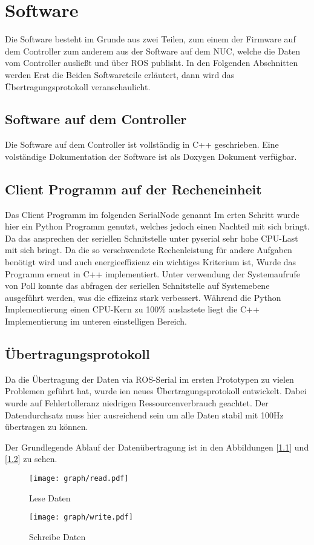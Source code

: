 \chapter{Software}

Die Software besteht im Grunde aus zwei Teilen, zum einem der Firmware auf dem \textmu Controller zum anderem aus der Software auf dem NUC, welche die Daten vom \textmu Controller ausließt und über ROS publisht.
In den Folgenden Abschnitten werden Erst die Beiden Softwareteile erläutert, dann wird das Übertragungsprotokoll veranschaulicht.


\section{Software auf dem \textmu Controller}
Die Software auf dem \textmu Controller ist vollständig in C++ geschrieben. Eine volständige Dokumentation der Software ist als Doxygen Dokument verfügbar.


\section{Client Programm auf der Recheneinheit}
Das Client Programm im folgenden SerialNode genannt 
Im erten Schritt wurde hier ein Python Programm genutzt, welches jedoch einen Nachteil mit sich bringt. Da das ansprechen der seriellen Schnitstelle unter pyserial sehr hohe CPU-Last mit sich bringt.
Da die so verschwendete Rechenleistung für andere Aufgaben benötigt wird und auch energieeffizienz ein wichtiges Kriterium ist, Wurde das Programm erneut in C++ implementiert. Unter verwendung der Systemaufrufe von 
Poll konnte das abfragen der seriellen Schnitstelle auf Systemebene ausgeführt werden, was die effizeinz stark verbessert. Während die Python Implementierung einen CPU-Kern zu 100\%
auslastete liegt die C++ Implementierung im unteren einstelligen Bereich.


\section{Übertragungsprotokoll}
Da die Übertragung der Daten via ROS-Serial im ersten Prototypen zu vielen Problemen geführt hat, wurde ien neues Übertragungsprotokoll entwickelt.
Dabei wurde auf Fehlertolleranz niedrigen Ressourcenverbrauch geachtet. Der Datendurchsatz muss hier ausreichend sein um alle Daten stabil mit 100Hz
übertragen zu können.


Der Grundlegende Ablauf der Datenübertragung ist in den Abbildungen [\ref{fig:uC_read}] und [\ref{fig:uC_write}] zu sehen.



\begin{figure}[ht]
\centering
\texttt{[image: graph/read.pdf]} 
\caption{Lese Daten}
\label{fig:uC_read}
\end{figure}


\begin{figure}[ht]
\centering
\texttt{[image: graph/write.pdf]} 
\caption{Schreibe Daten}
\label{fig:uC_write}
\end{figure}

